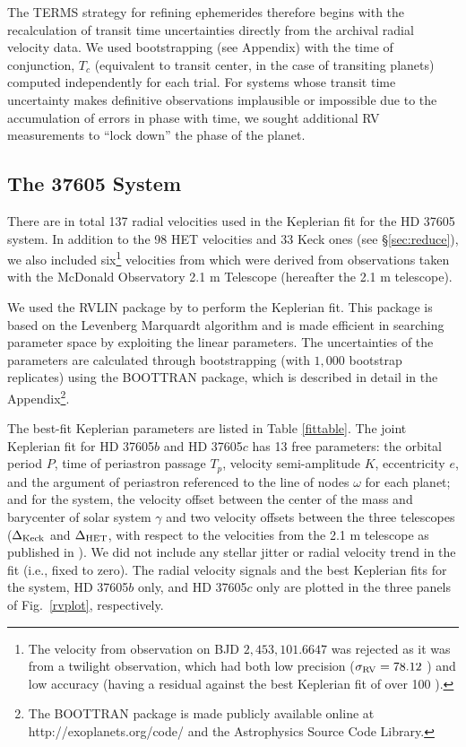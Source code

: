 The TERMS strategy for refining ephemerides therefore begins with the
recalculation of transit time uncertainties directly from the archival
radial velocity data.  We used bootstrapping (see Appendix) with the
time of conjunction, $T_c$ (equivalent to transit center, in the
case of transiting planets) computed independently for each trial.
For systems whose transit time uncertainty makes definitive
observations implausible or impossible due to the accumulation of
errors in phase with time, we sought additional RV measurements to
``lock down'' the phase of the planet.


\subsection{The 37605 System}\label{sec:fit}
There are in total 137 radial velocities used in the Keplerian fit for
the HD 37605 system. In addition to the 98 HET velocities and 33 Keck
ones (see \S \ref{sec:reduce}), we also included six\footnote{The
  velocity from observation on BJD $2,453,101.6647$ was rejected as it
  was from a twilight observation, which had both low precision
  ($\sigma_{\rm RV}=78.12$ \mps) and low accuracy (having a residual
  against the best Keplerian fit of over 100 \mps).} velocities from
\cite{cochran2004} which were derived from observations taken
with the McDonald Observatory 2.1 m Telescope (hereafter the 2.1 m
telescope).

We used the RVLIN package by \cite{2009ApJS..182..205W} to perform the
Keplerian fit. This package is based on the Levenberg\textendash
Marquardt algorithm and is made efficient in searching parameter space
by exploiting the linear parameters. The uncertainties of the
parameters are calculated through bootstrapping (with $1,000$
bootstrap replicates) using the BOOTTRAN package, which is described
in detail in the Appendix\footnote{The BOOTTRAN package is made
  publicly available online at http://exoplanets.org/code/ and the
  Astrophysics Source Code Library.}.

The best-fit Keplerian parameters are listed in Table
\ref{fittable}. The joint Keplerian fit for HD 37605$b$ and HD 37605$c$
has 13 free parameters: the orbital period $P$, time of periastron
passage $T_p$, velocity semi-amplitude $K$, eccentricity $e$, and the
argument of periastron referenced to the line of nodes $\omega$ for
each planet; and for the system, the velocity offset between the
center of the mass and barycenter of solar system $\gamma$ and two
velocity offsets between the three telescopes ($\Delta_{\rm Keck}$ and
$\Delta_{\rm HET}$, with respect to the velocities from the 2.1 m
telescope as published in \citealt{cochran2004}). We did not include
any stellar jitter or radial velocity trend in the fit (i.e., fixed to
zero). The radial velocity signals and the best Keplerian fits for the
system, HD 37605$b$ only, and HD 37605$c$ only are plotted in the
three panels of Fig.~\ref{rvplot}, respectively.


